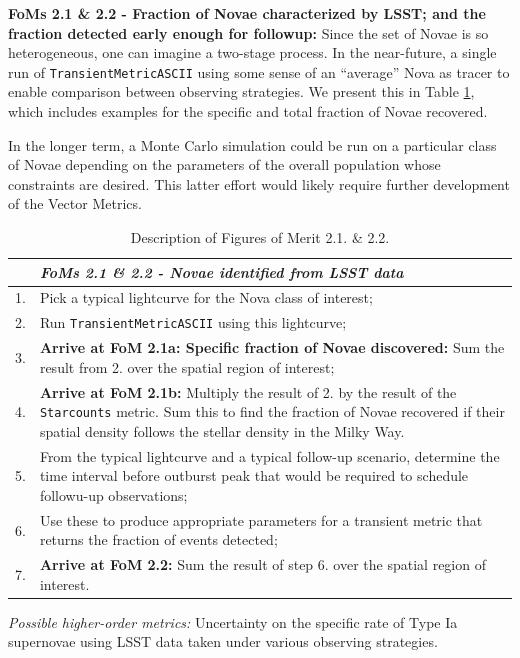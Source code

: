 {\bf FoMs 2.1 \& 2.2 - Fraction of Novae characterized by LSST; and the fraction detected early enough for followup:} Since the set of Novae is so heterogeneous, one can imagine a two-stage process. In the near-future, a single run of {\tt TransientMetricASCII} using some sense of an ``average'' Nova as tracer to enable comparison between observing strategies. We present this in Table \ref{table:pseudoFOM_2p1}, which includes examples for the specific and total fraction of Novae recovered.

In the longer term, a Monte Carlo simulation could be run on a particular class of Novae depending on the parameters of the overall population whose constraints are desired. This latter effort would likely require further development of the Vector Metrics.

\begin{table}[h]
  \small
  \begin{tabular}{c p{12cm}}
    & {\it FoMs 2.1 \& 2.2 - Novae identified from LSST data} \\
    \hline
  1. & Pick a typical lightcurve for the Nova class of interest; \\
  2. & Run {\tt TransientMetricASCII} using this lightcurve; \\
  3. & {\bf Arrive at FoM 2.1a: Specific fraction of Novae discovered:} Sum the result from 2. over the spatial region of interest; \\
  4. & {\bf Arrive at FoM 2.1b:} Multiply the result of 2. by the result of the {\tt Starcounts} metric. Sum this to find the fraction of Novae recovered if their spatial density follows the stellar density in the Milky Way. \\
  \hline
  5. & From the typical lightcurve and a typical follow-up scenario, determine the time interval before outburst peak that would be required to schedule followu-up observations;\\
  6. & Use these to produce appropriate parameters for a transient metric that returns the fraction of events detected; \\
  7. & {\bf Arrive at FoM 2.2:} Sum the result of step 6. over the spatial region of interest.\\
\hline
    \end{tabular}
 \caption{Description of Figures of Merit 2.1. \& 2.2.}
  \label{table:pseudoFOM_2p1}
\end{table}


{\it Possible higher-order metrics:} Uncertainty on the specific rate
of Type Ia supernovae using LSST data taken under various observing
strategies.


